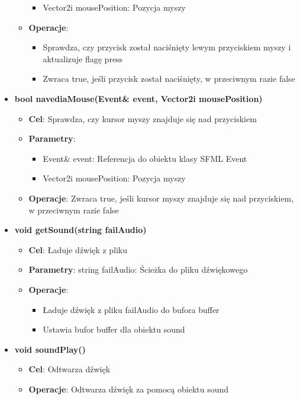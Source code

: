 \documentclass[a4paper, 10pt]{article}
\begin{document}
\begin{itemize}
\begin{itemize}
\begin{itemize}
					\item Vector2i mousePosition: Pozycja myszy
				\end{itemize}
			\item \textbf{Operacje}:
				\begin{itemize}
					\item Sprawdza, czy przycisk został naciśnięty lewym przyciskiem myszy i aktualizuje flagę press
					\item  Zwraca true, jeśli przycisk został naciśnięty, w przeciwnym razie false
				\end{itemize}
		\end{itemize}
	\item \textbf{bool navediaMouse(Event\& event, Vector2i mousePosition)}
		\begin{itemize}
			\item \textbf{Cel}: Sprawdza, czy kursor myszy znajduje się nad przyciskiem
			\item \textbf{Parametry}:
				\begin{itemize}
					\item Event\& event: Referencja do obiektu klasy SFML Event
					\item Vector2i mousePosition: Pozycja myszy
				\end{itemize}
			\item \textbf{Operacje}: Zwraca true, jeśli kursor myszy znajduje się nad przyciskiem, w przeciwnym razie false
		\end{itemize}
	\item \textbf{void getSound(string failAudio)}
		\begin{itemize}
			\item \textbf{Cel}: Ładuje dźwięk z pliku
			\item \textbf{Parametry}: string failAudio: Ścieżka do pliku dźwiękowego
			\item \textbf{Operacje}:
				\begin{itemize}
					\item Ładuje dźwięk z pliku failAudio do bufora buffer
					\item Ustawia bufor buffer dla obiektu sound
				\end{itemize}
		\end{itemize}
	\item \textbf{void soundPlay()}
		\begin{itemize}
			\item \textbf{Cel}: Odtwarza dźwięk
			\item \textbf{Operacje}: Odtwarza dźwięk za pomocą obiektu sound

\end{itemize}
\end{itemize}
\end{document}
